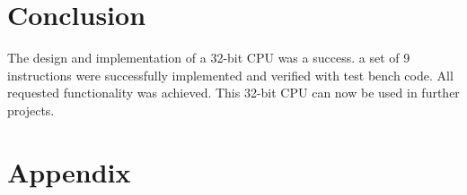 \documentclass[12pt]{article}
\begin{document}
\section{Conclusion}
The design and implementation of a 32-bit CPU was a success. a set of 9 instructions were successfully implemented and verified with test bench code. All requested functionality was achieved. This 32-bit CPU can now be used in further projects.

\section*{Appendix}

\label{code:tbCode}
\end{document}
